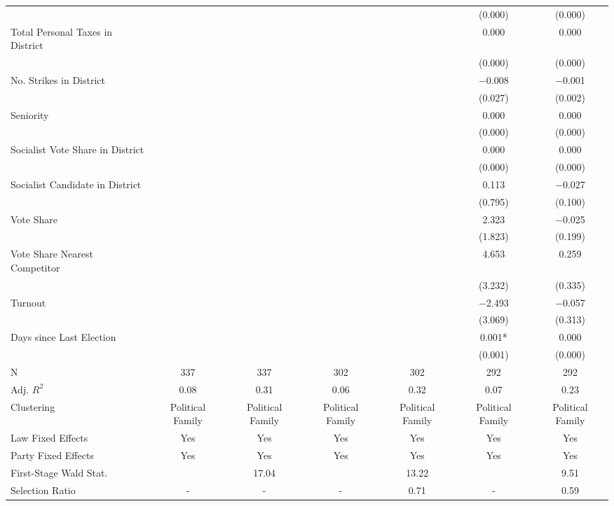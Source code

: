 \begin{table}[!h]
{\begin{threeparttable}
\begin{tabular}[t]{lcccccc}
 &  &  &  &  & (\num{0.000}) & \vphantom{3} (\num{0.000})\\
Total Personal Taxes in District &  &  &  &  & \num{0.000} & \num{0.000}\\
 &  &  &  &  & (\num{0.000}) & \vphantom{2} (\num{0.000})\\
No. Strikes in District &  &  &  &  & \num{-0.008} & \num{-0.001}\\
 &  &  &  &  & (\num{0.027}) & (\num{0.002})\\
Seniority &  &  &  &  & \num{0.000} & \num{0.000}\\
 &  &  &  &  & (\num{0.000}) & \vphantom{1} (\num{0.000})\\
Socialist Vote Share in District &  &  &  &  & \num{0.000} & \num{0.000}\\
 &  &  &  &  & (\num{0.000}) & (\num{0.000})\\
Socialist Candidate in District &  &  &  &  & \num{0.113} & \num{-0.027}\\
 &  &  &  &  & (\num{0.795}) & (\num{0.100})\\
Vote Share &  &  &  &  & \num{2.323} & \num{-0.025}\\
 &  &  &  &  & (\num{1.823}) & (\num{0.199})\\
Vote Share Nearest Competitor &  &  &  &  & \num{4.653} & \num{0.259}\\
 &  &  &  &  & (\num{3.232}) & (\num{0.335})\\
Turnout &  &  &  &  & \num{-2.493} & \num{-0.057}\\
 &  &  &  &  & (\num{3.069}) & (\num{0.313})\\
Days since Last Election &  &  &  &  & \num{0.001}* & \num{0.000}\\
 &  &  &  &  & (\num{0.001}) & (\num{0.000})\\
\midrule
N & \num{337} & \num{337} & \num{302} & \num{302} & \num{292} & \num{292}\\
Adj. $R^2$ & \num{0.08} & \num{0.31} & \num{0.06} & \num{0.32} & \num{0.07} & \num{0.23}\\
Clustering & Political Family & Political Family & Political Family & Political Family & Political Family & Political Family\\
Law Fixed Effects & Yes & Yes & Yes & Yes & Yes & Yes\\
Party Fixed Effects & Yes & Yes & Yes & Yes & Yes & Yes\\
First-Stage Wald Stat. &  & 17.04 &  & 13.22 &  & 9.51\\
Selection Ratio & - & - & - & 0.71 & - & 0.59\\

\end{tabular}
\end{threeparttable}}
\end{table}
